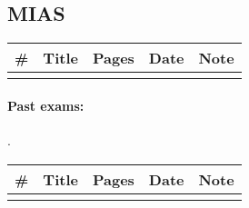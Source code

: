 \documentclass[a4paper,12pt]{article} %
\begin{document}
\subsection{MIAS}
\begin{tabularx}{\textwidth}{|l|X|c|l|c|}
	\hline
	\# & Title & Pages & Date & Note \\
	\hline
	&  &  &  &  \\
	\hline
\end{tabularx}

\paragraph{Past exams:}.\\
\begin{tabularx}{\textwidth}{|l|X|c|l|c|}
	\hline
	\# & Title & Pages & Date & Note \\
	\hline
	&  &  &  &  \\
	\hline
\end{tabularx}

\end{document}
